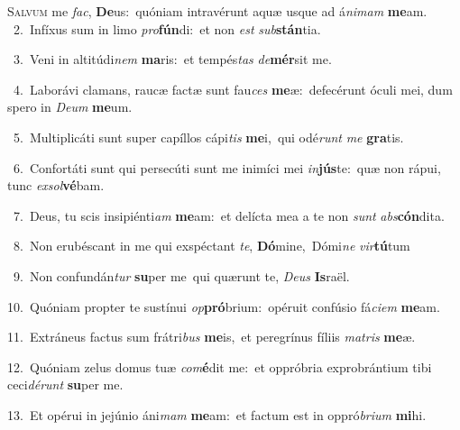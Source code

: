 \lettrine{\initial\textcolor{\initialcolor}{S}}{alvum} me \textit{fac}\-, \textbf{De}\-us:~\star quóniam intravérunt aquæ usque ad á\-\textit{ni}\-\textit{mam} \textbf{me}\-am.\\
{\numbfont\textcolor{\numbcolor}{~2.}}~Infíxus sum in limo \textit{pro}\-\textbf{fún}di:~\star et non \textit{est} \textit{sub}\-\textbf{stán}tia.\par
{\numbfont\textcolor{\numbcolor}{~3.}}~Veni in altitúdi\textit{nem} \textbf{ma}\-ris:~\star et tempés\textit{tas} \textit{de}\-\textbf{mér}sit me.\par
{\numbfont\textcolor{\numbcolor}{~4.}}~Laborávi clamans, raucæ factæ sunt fau\textit{ces} \textbf{me}\-æ:~\star defecérunt óculi mei, dum spero in \textit{De}\-\textit{um} \textbf{me}\-um.\par
{\numbfont\textcolor{\numbcolor}{~5.}}~Multiplicáti sunt super capíllos cápi\textit{tis} \textbf{me}\-i,~\star qui odé\textit{runt} \textit{me} \textbf{gra}\-tis.\par
{\numbfont\textcolor{\numbcolor}{~6.}}~Confortáti sunt qui persecúti sunt me inimíci mei \textit{in}\-\textbf{jús}te:~\star quæ non rápui, tunc \textit{ex}\-\textit{sol}\textbf{vé}bam.\par
{\numbfont\textcolor{\numbcolor}{~7.}}~Deus, tu scis insipiénti\textit{am} \textbf{me}\-am:~\star et delícta mea a te non \textit{sunt} \textit{abs}\-\textbf{cón}dita.\par
{\numbfont\textcolor{\numbcolor}{~8.}}~Non erubéscant in me qui exspéctant \textit{te}\-, \textbf{Dó}\-mine,~\star Dómi\textit{ne} \textit{vir}\-\textbf{tú}tum\par
{\numbfont\textcolor{\numbcolor}{~9.}}~Non confundán\textit{tur} \textbf{su}\-per me~\star qui quærunt te, \textit{De}\-\textit{us} \textbf{Is}\-raël.\par
{\numbfont\textcolor{\numbcolor}{10.}}~Quóniam propter te sustínui \textit{op}\-\textbf{pró}brium:~\star opéruit confúsio fá\-\textit{ci}\-\textit{em} \textbf{me}\-am.\par
{\numbfont\textcolor{\numbcolor}{11.}}~Extráneus factus sum frátri\textit{bus} \textbf{me}\-is,~\star et peregrínus fíliis \textit{ma}\-\textit{tris} \textbf{me}\-æ.\par
{\numbfont\textcolor{\numbcolor}{12.}}~Quóniam zelus domus tuæ \textit{com}\-\textbf{é}dit me:~\star et oppróbria exprobrántium tibi ceci\-\textit{dé}\-\textit{runt} \textbf{su}\-per me.\par
{\numbfont\textcolor{\numbcolor}{13.}}~Et opérui in jejúnio áni\textit{mam} \textbf{me}\-am:~\star et factum est in oppró\-\textit{bri}\-\textit{um} \textbf{mi}\-hi.\par
